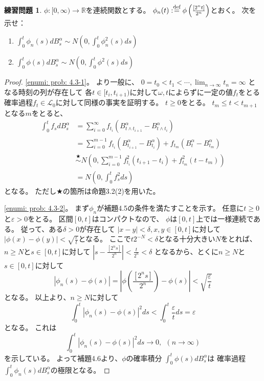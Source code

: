 \documentclass[uplatex]{jsarticle}
\theoremstyle{definition}
\newtheorem{prob}[prob]{練習問題}
\def\ep{\varepsilon}
\def\R{\mathbb{R}}
\def\mcL{\mathcal{L}}
\def\dfn{:\overset{\mbox{{\scriptsize def}}}{=}}
\begin{document}
\begin{prob}\label{prob: 4.3}
  \(\phi: [0,\infty )\to \R\)を連続関数とする。
  \(\phi_n(t) \dfn \phi\left( \frac{[2^nt]}{2^n}\right)\)とおく。
  次を示せ：
  \begin{enumerate}
    \item \label{enumi: prob: 4.3-1}
    \(\int_0^t\phi_n(s)dB_s^\alpha
    \sim N\left( 0,\int_0^t\phi_n^2(s)ds \right)\)
    \item \label{enumi: prob: 4.3-2}
    \(\int_0^t\phi(s)dB_s^\alpha
    \sim N\left( 0,\int_0^t\phi^2(s)ds \right)\)
  \end{enumerate}
\end{prob}

\begin{proof}
  \ref{enumi: prob: 4.3-1}。
  より一般に、
  \(0 = t_0 < t_1 < \cdots , \lim_{n\to \infty}t_n = \infty\)
  となる時刻の列が存在して
  各\(t\in [t_i,t_{i+1})\)に対して\(\omega,t\)によらずに一定の値\(f_t\)をとる
  確率過程\(f_t\in \mcL_0\)に対して同様の事実を証明する。
  \(t\geq 0\)をとる。
  \(t_m \leq t < t_{m+1}\)となる\(m\)をとると、
  \begin{align*}
    \int_0^t f_s dB_s^\alpha
    &= \sum_{i=0}^\infty f_{t_i} \left(
    B_{t\wedge t_{i+1}}^\alpha - B_{t\wedge t_i}^\alpha\right) \\
    &= \sum_{i=0}^{m-1} f_{t_i} \left(
    B_{t_{i+1}}^\alpha - B_{t_i}^\alpha\right)
    + f_{t_m} \left( B_t^\alpha - B_{t_m}^\alpha\right) \\
    &\overset{\bigstar}{\sim}
    N\left(0,
    \sum_{i=0}^{m-1}f_{t_i}^2(t_{i+1}-t_i)
    + f_{t_m}^2(t-t_m)\right) \\
    &= N\left(0, \int_0^t f_s^2 ds\right)
  \end{align*}
  となる。
  ただし\(\bigstar\)の箇所は命題3.2(2)を用いた。

  \ref{enumi: prob: 4.3-2}。
  まず\(\phi_n\)が補題4.5の条件を満たすことを示す。
  任意に\(t\geq 0\)と\(\ep > 0\)をとる。
  区間\([0,t]\)はコンパクトなので、
  \(\phi\)は\([0,t]\)上では一様連続である。
  従って、ある\(\delta > 0\)が存在して
  \(|x-y| < \delta , x,y\in [0,t]\)に対して
  \(|\phi(x)-\phi(y)| < \sqrt{\frac{\ep}{t}}\)となる。
  ここで\(t2^{-N} < \delta\)となる十分大きい\(N\)をとれば、
  \(n \geq N\)と\(s\in [0,t]\)に対して
  \(\left| s - \frac{[2^ns]}{2^n}\right| < \frac{t}{2^n} < \delta\)
  となるから、とくに\(n\geq N\)と\(s\in [0,t]\)に対して
  \[
  \left| \phi_n(s)-\phi(s) \right|
  = \left| \phi(\frac{[2^ns]}{2^n})-\phi(s) \right|
  < \sqrt{\frac{\ep}{t}}
  \]
  となる。
  以上より、\(n \geq N\)に対して
  \[
  \int_0^t\left|\phi_n(s)-\phi(s)\right|^2ds
  < \int_0^t \frac{\ep}{t} ds = \ep
  \]
  となる。
  これは
  \[
  \int_0^t\left|\phi_n(s)-\phi(s)\right|^2ds \to 0, \ \ (n\to \infty)
  \]
  を示している。
  よって補題4.6より、\(\phi\)の確率積分
  \(\int_0^t\phi(s)dB_s^\alpha\)は
  確率過程\(\int_0^t\phi_n(s)dB_s^\alpha\)の極限となる。


\end{proof}
\end{document}
